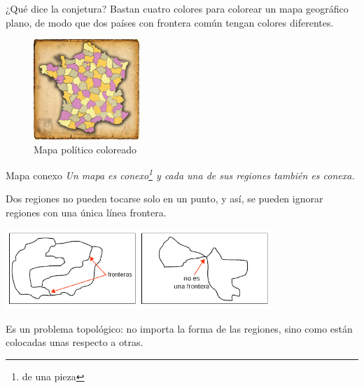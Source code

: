 \documentclass[spanish,utf8]{beamer}
\begin{document}
\begin{frame}{\insertsection}\transblindsvertical


\begin{block}{¿Qué dice la conjetura?}
Bastan cuatro colores para colorear un mapa geográfico plano, de modo que dos países con frontera común tengan colores diferentes.
\end{block}

\begin{minipage}[c]{6cm}
\begin{figure}
    \centering
    \includegraphics[width=4cm]{mapa-4-colores_HR.jpg}
    \caption{Mapa político coloreado}
\end{figure}
\end{minipage}
\begin{minipage}[c]{5cm}
\begin{block}{Mapa conexo}\em
Un mapa es conexo\footnote{de una pieza} y cada una de sus regiones también es conexa.
\end{block}
\end{minipage}
\end{frame}

\begin{frame}{\insertsection}
\begin{block}{}
Dos regiones no pueden tocarse solo en un punto, y así, se pueden ignorar regiones con una única línea frontera.
\end{block}
\begin{center}
\includegraphics[height=3cm]{fronteras.png}
\end{center}

\begin{block}{}
Es un problema topológico: no importa la forma de las regiones, sino como están colocadas unas respecto a otras.
\end{block}
\end{frame}
\end{document}
